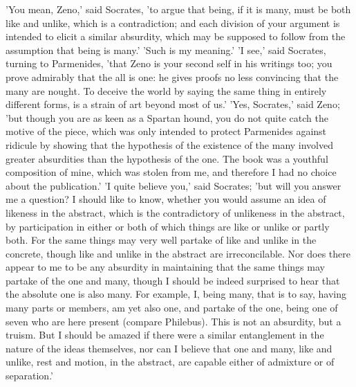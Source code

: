 \documentclass[11pt,letter]{article}
\begin{document}
\par  'You mean, Zeno,' said Socrates, 'to argue that being, if it is many, must be both like and unlike, which is a contradiction; and each division of your argument is intended to elicit a similar absurdity, which may be supposed to follow from the assumption that being is many.' 'Such is my meaning.' 'I see,' said Socrates, turning to Parmenides, 'that Zeno is your second self in his writings too; you prove admirably that the all is one: he gives proofs no less convincing that the many are nought. To deceive the world by saying the same thing in entirely different forms, is a strain of art beyond most of us.' 'Yes, Socrates,' said Zeno; 'but though you are as keen as a Spartan hound, you do not quite catch the motive of the piece, which was only intended to protect Parmenides against ridicule by showing that the hypothesis of the existence of the many involved greater absurdities than the hypothesis of the one. The book was a youthful composition of mine, which was stolen from me, and therefore I had no choice about the publication.' 'I quite believe you,' said Socrates; 'but will you answer me a question? I should like to know, whether you would assume an idea of likeness in the abstract, which is the contradictory of unlikeness in the abstract, by participation in either or both of which things are like or unlike or partly both. For the same things may very well partake of like and unlike in the concrete, though like and unlike in the abstract are irreconcilable. Nor does there appear to me to be any absurdity in maintaining that the same things may partake of the one and many, though I should be indeed surprised to hear that the absolute one is also many. For example, I, being many, that is to say, having many parts or members, am yet also one, and partake of the one, being one of seven who are here present (compare Philebus). This is not an absurdity, but a truism. But I should be amazed if there were a similar entanglement in the nature of the ideas themselves, nor can I believe that one and many, like and unlike, rest and motion, in the abstract, are capable either of admixture or of separation.'
\end{document}
